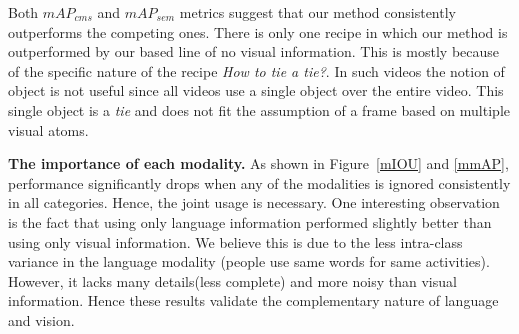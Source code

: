 \begin{table}
\caption{Semantic mean-average-precision $mAP_{sem}$.}
{\small
{}}
\normalsize
\vspace{-8mm}
\end{table}

Both $mAP_{cms}$ and $mAP_{sem}$ metrics suggest that our method consistently outperforms the competing ones. There is only one recipe in which our method is outperformed by our based line of no visual information. This is mostly because of the specific nature of the recipe \emph{How to tie a tie?}. In such videos the notion of object is not useful since all videos use a single object over the entire video. This single object is a \emph{tie} and does not fit the assumption of a frame based on multiple visual atoms.

\vspace{1mm}
\noindent\textbf{The importance of each modality.}
As shown in Figure~\ref{mIOU} and \ref{mmAP}, performance significantly drops when any of the modalities is ignored consistently in all categories. Hence, the joint usage is necessary. One interesting observation is the fact that using only language information performed slightly better than using only visual information. We believe this is due to the less intra-class variance in the language modality (\ie people use same words for same activities). However, it lacks many details(less complete) and more noisy than visual information. Hence these results validate the complementary nature of language and vision.
